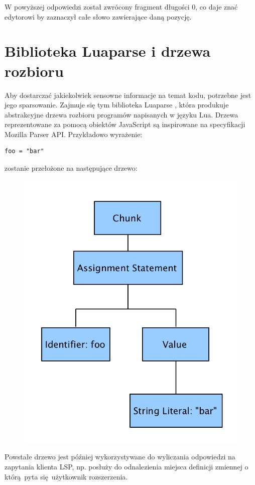 W powyższej odpowiedzi został zwrócony fragment długości 0, co daje znać edytorowi by zaznaczył całe słowo zawierające daną pozycję.

\section{Biblioteka Luaparse i drzewa rozbioru}
Aby dostarczać jakiekolwiek sensowne informacje na temat kodu, potrzebne jest jego sparsowanie. Zajmuje się tym biblioteka Luaparse \cite{luaparse}, która produkuje abstrakcyjne drzewa rozbioru programów napisanych w języku Lua. Drzewa reprezentowane za pomocą obiektów JavaScript są inspirowane na specyfikacji Mozilla Parser API. Przykładowo wyrażenie:

\begin{lstlisting}[language={[5.3]Lua}]
foo = "bar"
\end{lstlisting}
zostanie przełożone na następujące drzewo:

\begin{figure}[H]
    \centering
    \includegraphics[scale=0.6]{Chapters/ast}
    \end{figure}

Powstałe drzewo jest później wykorzystywane do wyliczania odpowiedzi na zapytania klienta LSP, np. posłuży do odnalezienia miejsca definicji zmiennej o którą pyta się użytkownik rozszerzenia.
